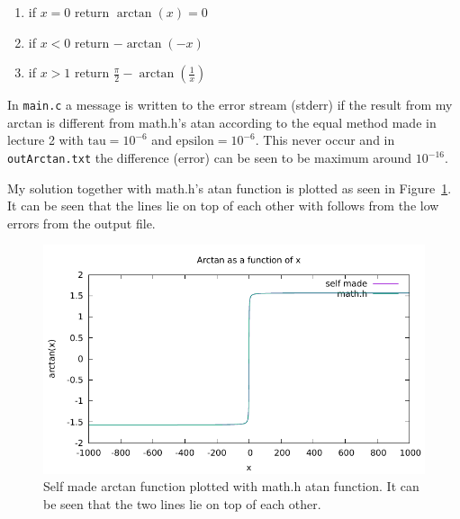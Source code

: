 \documentclass[a4paper,10pt,onecolumn]{article}
\begin{document}
\begin{enumerate}
	\item if $x=0$ return $\operatorname{arctan}(x)=0$
	\item if $x<0$ return $-\operatorname{arctan}(-x)$
	\item if $x>1$ return $\frac{\pi}{2} - \operatorname{arctan}(\frac{1}{x})$
\end{enumerate}

In \texttt{main.c} a message is written to the error stream (stderr) if the result from my arctan is different from math.h's atan according to the equal method made in lecture 2 with $\mathrm{tau} = 10^{-6}$ and $\mathrm{epsilon} = 10^{-6}$. This never occur and in \texttt{outArctan.txt} the difference (error) can be seen to be maximum around $10^{-16}$. 

My solution together with math.h's atan function is plotted as seen in Figure~\ref{fig:arctan}. It can be seen that the lines lie on top of each other with follows from the low errors from the output file.

\begin{figure}[!htbp]
	\centering
	\includegraphics{plotArctan.pdf}
	\caption{Self made arctan function plotted with math.h atan function. It can be seen that the two lines lie on top of each other.}
	\label{fig:arctan}
\end{figure}
\end{document}
